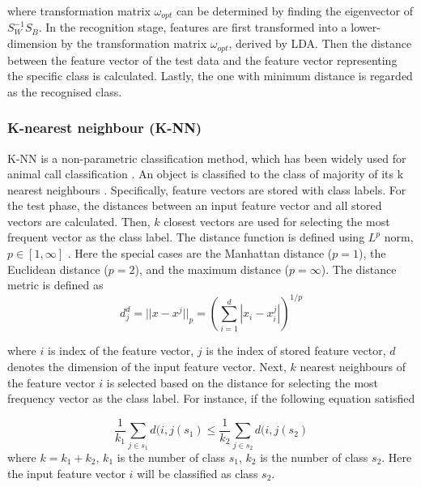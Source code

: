 where transformation matrix $\omega_{opt}$ can be determined by finding the eigenvector of $S_{W}^{-1}S_{B}$.
In the recognition stage, features are first transformed into a lower-dimension by the transformation matrix $\omega_{opt}$, derived by LDA. Then the distance between the feature vector of the test data and the feature vector representing the specific class is calculated. Lastly, the one with minimum distance is regarded as the recognised class.


\subsubsection{K-nearest neighbour (K-NN)}
K-NN is a non-parametric classification method, which has been widely used for animal call classification \citep{huang2009frog, han2011acoustic, Xie1504:Acoustic, Xie2016}. An object is classified to the class of majority of its k nearest neighbours \citep{huang2009frog}.  Specifically, feature vectors are stored with class labels. For the test phase, the distances between an input feature vector and all stored vectors are calculated. Then, $k$ closest vectors are used for selecting the most frequent vector as the class label. The distance function is defined using $L^{p}$ norm, $p \in [1,\infty]$ . Here the special cases are the Manhattan distance ($p=1$), the Euclidean distance ($p=2$), and the maximum distance ($p= \infty$). The distance metric is defined as 
\begin{equation}
d_{j}^{d}=||x-x^{j}||_{p} = (\sum_{i=1}^{d}|x_{i}-x_{i}^{j}|)^{1/p}
\end{equation}

where $i$ is index of the feature vector, $j$ is the index of stored feature vector, $d$ denotes the dimension of the input feature vector. 
Next, $k$ nearest neighbours of the feature vector $i$ is selected based on the distance for selecting the most frequency vector as the class label. For instance, if the following equation satisfied 

\begin{equation}
\frac{1}{k_{1}}\sum_{j \in s_{1}}d(i,j(s_{1}) \leq \frac{1}{k_{2}}\sum_{j \in s_{2}}d(i,j(s_{2})
\end{equation}
where $k=k_{1}+k_{2}$, $k_{1}$ is the number of class $s_{1}$, $k_{2}$ is the number of class $s_{2}$. Here the input feature vector $i$ will be classified as class $s_{2}$. 




